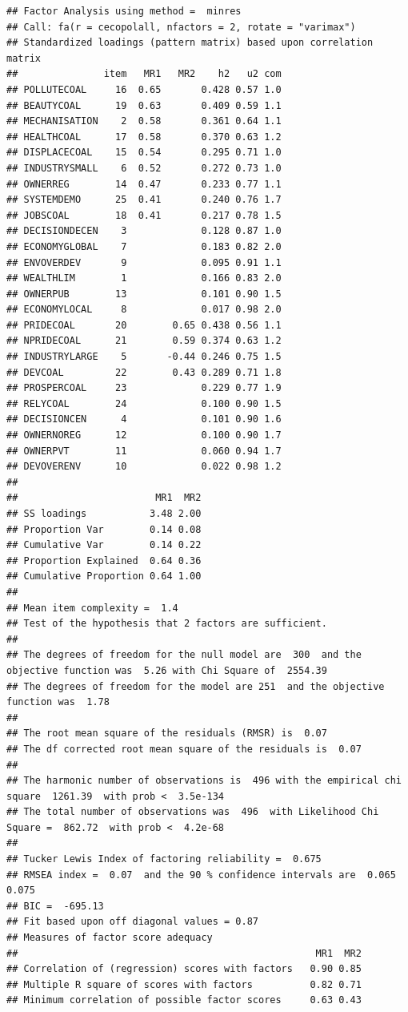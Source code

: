 \documentclass[
]{article}
\begin{document}
\begin{verbatim}
## Factor Analysis using method =  minres
## Call: fa(r = cecopolall, nfactors = 2, rotate = "varimax")
## Standardized loadings (pattern matrix) based upon correlation matrix
##               item   MR1   MR2    h2   u2 com
## POLLUTECOAL     16  0.65       0.428 0.57 1.0
## BEAUTYCOAL      19  0.63       0.409 0.59 1.1
## MECHANISATION    2  0.58       0.361 0.64 1.1
## HEALTHCOAL      17  0.58       0.370 0.63 1.2
## DISPLACECOAL    15  0.54       0.295 0.71 1.0
## INDUSTRYSMALL    6  0.52       0.272 0.73 1.0
## OWNERREG        14  0.47       0.233 0.77 1.1
## SYSTEMDEMO      25  0.41       0.240 0.76 1.7
## JOBSCOAL        18  0.41       0.217 0.78 1.5
## DECISIONDECEN    3             0.128 0.87 1.0
## ECONOMYGLOBAL    7             0.183 0.82 2.0
## ENVOVERDEV       9             0.095 0.91 1.1
## WEALTHLIM        1             0.166 0.83 2.0
## OWNERPUB        13             0.101 0.90 1.5
## ECONOMYLOCAL     8             0.017 0.98 2.0
## PRIDECOAL       20        0.65 0.438 0.56 1.1
## NPRIDECOAL      21        0.59 0.374 0.63 1.2
## INDUSTRYLARGE    5       -0.44 0.246 0.75 1.5
## DEVCOAL         22        0.43 0.289 0.71 1.8
## PROSPERCOAL     23             0.229 0.77 1.9
## RELYCOAL        24             0.100 0.90 1.5
## DECISIONCEN      4             0.101 0.90 1.6
## OWNERNOREG      12             0.100 0.90 1.7
## OWNERPVT        11             0.060 0.94 1.7
## DEVOVERENV      10             0.022 0.98 1.2
## 
##                        MR1  MR2
## SS loadings           3.48 2.00
## Proportion Var        0.14 0.08
## Cumulative Var        0.14 0.22
## Proportion Explained  0.64 0.36
## Cumulative Proportion 0.64 1.00
## 
## Mean item complexity =  1.4
## Test of the hypothesis that 2 factors are sufficient.
## 
## The degrees of freedom for the null model are  300  and the objective function was  5.26 with Chi Square of  2554.39
## The degrees of freedom for the model are 251  and the objective function was  1.78 
## 
## The root mean square of the residuals (RMSR) is  0.07 
## The df corrected root mean square of the residuals is  0.07 
## 
## The harmonic number of observations is  496 with the empirical chi square  1261.39  with prob <  3.5e-134 
## The total number of observations was  496  with Likelihood Chi Square =  862.72  with prob <  4.2e-68 
## 
## Tucker Lewis Index of factoring reliability =  0.675
## RMSEA index =  0.07  and the 90 % confidence intervals are  0.065 0.075
## BIC =  -695.13
## Fit based upon off diagonal values = 0.87
## Measures of factor score adequacy             
##                                                    MR1  MR2
## Correlation of (regression) scores with factors   0.90 0.85
## Multiple R square of scores with factors          0.82 0.71
## Minimum correlation of possible factor scores     0.63 0.43
\end{verbatim}
\end{document}
